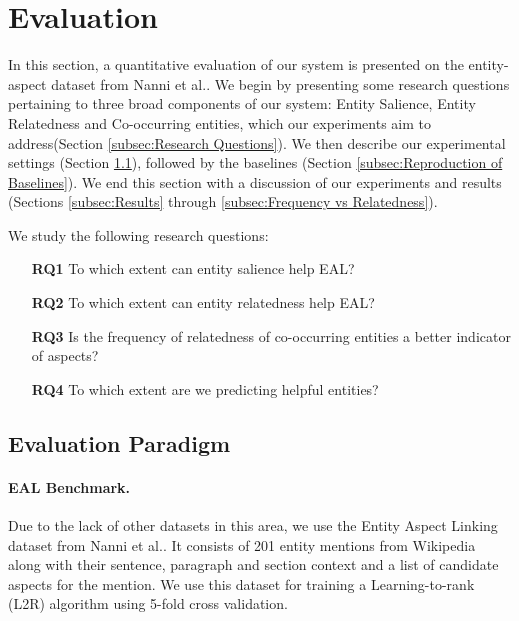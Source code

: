 
\section{Evaluation}
\label{sec:Evaluation}
In this section, a quantitative evaluation of our system is presented on the entity-aspect dataset from Nanni et al.\cite{nanni2018entity}. We begin by presenting some research questions pertaining to three broad components of our system: Entity Salience, Entity Relatedness and Co-occurring entities, which our experiments aim to address(Section \ref{subsec:Research Questions}). We then describe our experimental settings (Section \ref{subsec:Evaluation Paradigm}), followed by the baselines (Section \ref{subsec:Reproduction of Baselines}). We end this section with a discussion of our experiments and results (Sections \ref{subsec:Results} through \ref{subsec:Frequency vs Relatedness}).

\label{subsec:Research Questions}
We study the following research questions:
\begin{itemize}
\item[\textbf{RQ1}] To which extent can  entity salience help EAL?
\item[\textbf{RQ2}] To which extent can entity relatedness help EAL?
\item[\textbf{RQ3}] Is the frequency of relatedness of co-occurring entities a better indicator of aspects? 
\item[\textbf{RQ4}] To which extent are we predicting helpful entities?
\end{itemize}

\subsection{Evaluation Paradigm}
\label{subsec:Evaluation Paradigm}

\paragraph{\textbf{EAL Benchmark.}} Due to the lack of other datasets in this area, we use the Entity Aspect Linking dataset from Nanni et al.\cite{nanni2018entity}. It consists of 201 entity mentions from Wikipedia along with their sentence, paragraph and section context and a list of candidate aspects for the mention.   We use this dataset for training a Learning-to-rank (L2R) algorithm using 5-fold cross validation. 

